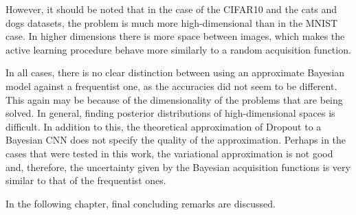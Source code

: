 However, it should be noted that in the case of the CIFAR10 and the cats and dogs datasets, the problem is much more high-dimensional than in the MNIST case. In higher dimensions there is more space between images, which makes the active learning procedure behave more similarly to a random acquisition function.

In all cases, there is no clear distinction between using an approximate Bayesian model against a frequentist one, as the accuracies did not seem to be different. This again may be because of the dimensionality of the problems that are being solved. In general, finding posterior distributions of high-dimensional spaces is difficult. In addition to this, the theoretical approximation of Dropout to a Bayesian CNN does not specify the quality of the approximation. Perhaps in the cases that were tested in this work, the variational approximation is not good and, therefore, the uncertainty given by the Bayesian acquisition functions is very similar to that of the frequentist ones.

In the following chapter, final concluding remarks are discussed.
